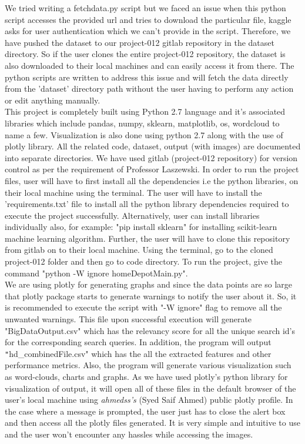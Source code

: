 \documentclass{sig-alternate-05-2015}
\begin{document}
We tried writing a fetchdata.py script but we faced an issue when this python script accesses the provided url and tries to download the particular file, kaggle asks for user authentication which we can't provide in the script. Therefore, we have pushed the dataset to our project-012 gitlab repository in the dataset directory. So if the user clones the entire project-012 repository, the dataset is also downloaded to their local machines and can easily access it from there. The python scripts are written to address this issue and will fetch the data directly from the 'dataset' directory path without the user having to perform any action or edit anything manually. \\
This project is completely built using Python 2.7 language and it's associated libraries which include pandas, numpy, sklearn, matplotlib, os, wordcloud to name a few. Visualization is also done using python 2.7 along with the use of plotly library. All the related code, dataset, output (with images) are documented into separate directories. We have used gitlab (project-012 repository) for version control as per the requirement of Professor Laszewski. In order to run the project files, user will have to first install all the dependencies i.e the python libraries, on their local machine using the terminal. The user will have to install the 'requirements.txt' file to install all the python library dependencies required to execute the project successfully. Alternatively, user can install libraries individually also, for example: "pip install sklearn" for installing scikit-learn machine learning algorithm. Further, the user will have to clone this repository from gitlab on to their local machine. Using the terminal, go to the cloned project-012 folder and then go to code directory. To run the project, give the command "python -W ignore homeDepotMain.py".\\
We are using plotly for generating graphs and since the data points are so large that plotly package starts to generate warnings to notify the user about it. So, it is recommended to execute the script with "-W ignore" flag to remove all the unwanted warnings. This file upon successful execution will generate "BigDataOutput.csv" which has the relevancy score for all the unique search id's for the corresponding search queries. In addition, the program will output \texttt"{hd\_combinedFile}.csv" which has the all the extracted features and other performance metrics. Also, the program will generate various visualization such as word-clouds, charts and graphs. As we have used plotly's python library for visualization of output, it will open all of these files in the default browser of the user's local machine using {\itshape ahmedss's} (Syed Saif Ahmed) public plotly profile. In the case where a message is prompted, the user just has to close the alert box and then access all the plotly files generated. It is very simple and intuitive to use and the user won't encounter any hassles while accessing the images. 
\newline 
\end{document}
